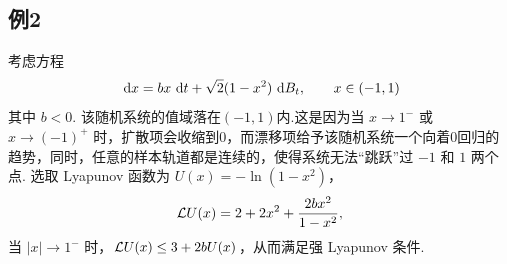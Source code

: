 \subsection*{例2}
考虑方程
\[
 \text{ d} x = bx \text{ d} t + \sqrt{2} (1-x^2)\text{ d} B_t ,\qquad x\in(-1,1)
\]
其中 $b<0$. 
该随机系统的值域落在$(-1,1)$内.这是因为当 $x \to 1^-$ 或 $x\to (-1)^{+}$ 时，扩散项会收缩到0，而漂移项给予该随机系统一个向着0回归的趋势，同时，任意的样本轨道都是连续的，使得系统无法“跳跃”过 $-1$ 和 $1$ 两个点. 
选取 Lyapunov 函数为 $U(x) =  -\ln(1-x^2)$，
\[
\mathcal{L} U(x) = 2+2x^2+\frac{2bx^2}{1-x^2},
\]
当 $|x| \to 1^-$ 时，$\mathcal{L} U(x) \le 3 + 2b U(x)$，从而满足强 Lyapunov 条件. 

\begin{figure}[!htbp]
	\centering 

\end{figure}
